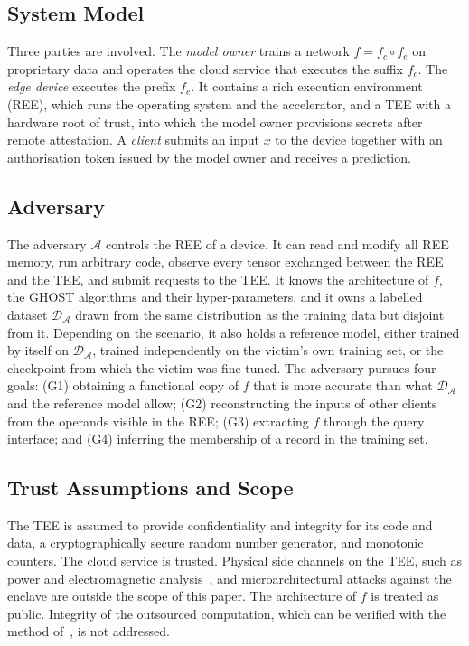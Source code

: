 \documentclass[lettersize,journal]{IEEEtran}
\begin{document}
\subsection{System Model}
Three parties are involved. The \emph{model owner} trains a network $f=f_c\circ f_e$ on proprietary data and operates the cloud service that executes the suffix $f_c$. The \emph{edge device} executes the prefix $f_e$. It contains a rich execution environment (REE), which runs the operating system and the accelerator, and a TEE with a hardware root of trust, into which the model owner provisions secrets after remote attestation. A \emph{client} submits an input $x$ to the device together with an authorisation token issued by the model owner and receives a prediction.

\subsection{Adversary}
The adversary $\mathcal{A}$ controls the REE of a device. It can read and modify all REE memory, run arbitrary code, observe every tensor exchanged between the REE and the TEE, and submit requests to the TEE. It knows the architecture of $f$, the GHOST algorithms and their hyper-parameters, and it owns a labelled dataset $\mathcal{D}_{\mathcal{A}}$ drawn from the same distribution as the training data but disjoint from it. Depending on the scenario, it also holds a reference model, either trained by itself on $\mathcal{D}_{\mathcal{A}}$, trained independently on the victim's own training set, or the checkpoint from which the victim was fine-tuned. The adversary pursues four goals: (G1) obtaining a functional copy of $f$ that is more accurate than what $\mathcal{D}_{\mathcal{A}}$ and the reference model allow; (G2) reconstructing the inputs of other clients from the operands visible in the REE; (G3) extracting $f$ through the query interface; and (G4) inferring the membership of a record in the training set.

\subsection{Trust Assumptions and Scope}
The TEE is assumed to provide confidentiality and integrity for its code and data, a cryptographically secure random number generator, and monotonic counters. The cloud service is trusted. Physical side channels on the TEE, such as power and electromagnetic analysis~\cite{batina2018csi,horvath2024sok}, and microarchitectural attacks against the enclave are outside the scope of this paper. The architecture of $f$ is treated as public. Integrity of the outsourced computation, which can be verified with the method of~\cite{tramer2018slalom}, is not addressed.
\end{document}
